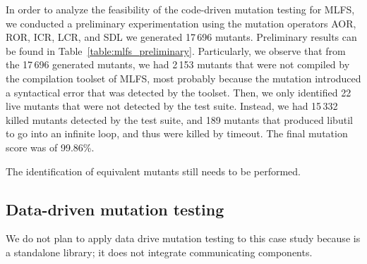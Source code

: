 

In order to analyze the feasibility of the code-driven mutation testing for MLFS, we conducted a preliminary experimentation using the mutation operators AOR, ROR, ICR, LCR, and SDL we generated 17\,696 mutants. Preliminary results can be found in Table~\ref{table:mlfs_preliminary}.
Particularly, we observe that from the 17\,696 generated mutants, we had 2\,153 mutants that were not compiled by the compilation toolset of MLFS, most probably because the mutation introduced a syntactical error that was detected by the toolset.
Then, we only identified 22 live mutants that were not detected by the test suite. Instead, we had 15\,332 killed mutants detected by the test suite, and 189 mutants that produced libutil to go into an infinite loop, and thus were killed by timeout. The final mutation score was of 99.86\%.

The identification of equivalent mutants still needs to be performed.


\subsection{Data-driven mutation testing}

We do not plan to apply data drive mutation testing to this case study because is a standalone library; it does not integrate communicating components.



